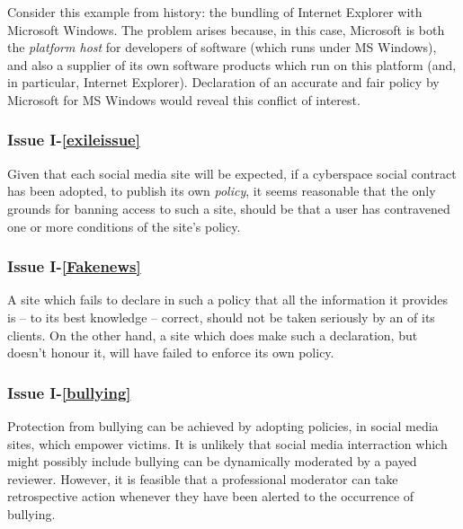 %
Consider this example from history: the bundling of Internet Explorer 
with Microsoft Windows.  
The problem arises because, in this case, Microsoft is both the 
{\em platform host} for developers of software (which runs under MS Windows),
and also a supplier of its own software
products which run on this platform (and, in particular, Internet Explorer).
Declaration of an accurate and fair policy by Microsoft for MS Windows would reveal
this conflict of interest.

\subsubsection*{Issue I-\ref{exileissue}}\label{exilesol}

Given that each social media site will be expected, if a cyberspace
social contract has been adopted, to publish its own {\em policy}, it
seems reasonable that the only grounds for banning access to such a
site, should be that a user has contravened one or more conditions of the site's
policy. 

\subsubsection*{Issue I-\ref{Fakenews}}\label{disinfsol}


A site which fails to declare in such a policy that all the information it provides
is -- to its best knowledge -- correct, should not be taken seriously
by an of its clients. On the other hand, a site which does make such
a declaration, but doesn't honour it, will have failed to enforce its own policy.

\subsubsection*{Issue I-\ref{bullying}}\label{bullyingsol}

Protection from bullying can be achieved by adopting policies,
in social media sites, which empower victims. It is unlikely
that social media interraction which might possibly include bullying
can be dynamically moderated by a payed reviewer. However, it is feasible
that a professional moderator can take retrospective action whenever
they have been alerted to the occurrence of bullying.


